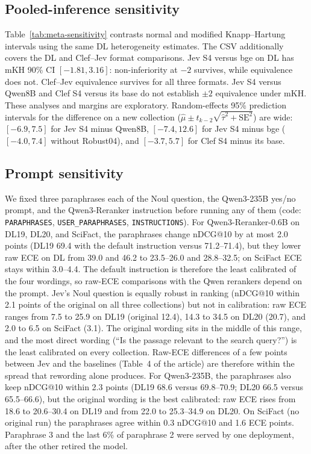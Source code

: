 \subsection{Pooled-inference sensitivity}

Table~\ref{tab:meta-sensitivity} contrasts normal and modified Knapp--Hartung intervals using the same DL heterogeneity estimates. The CSV additionally covers the DL and Clef--Jev format comparisons. Jev S4 versus bge on DL has mKH 90\% CI $[-1.81,3.16]$: non-inferiority at $-2$ survives, while equivalence does not. Clef--Jev equivalence survives for all three formats. Jev S4 versus Qwen8B and Clef S4 versus its base do not establish $\pm2$ equivalence under mKH. These analyses and margins are exploratory. Random-effects 95\% prediction intervals for the difference on a new collection ($\hat\mu\pm t_{k-2}\sqrt{\hat\tau^2+\mathrm{SE}^2}$) are wide: $[-6.9,7.5]$ for Jev S4 minus Qwen8B, $[-7.4,12.6]$ for Jev S4 minus bge ($[-4.0,7.4]$ without Robust04), and $[-3.7,5.7]$ for Clef S4 minus its base.

\subsection{Prompt sensitivity}\label{app:prompts}

We fixed three paraphrases each of the Noul question, the Qwen3-235B yes/no prompt, and the Qwen3-Reranker instruction before running any of them (code: \texttt{PARAPHRASES}, \texttt{USER\_PARAPHRASES}, \texttt{INSTRUCTIONS}). For Qwen3-Reranker-0.6B on DL19, DL20, and SciFact, the paraphrases change nDCG@10 by at most 2.0 points (DL19 69.4 with the default instruction versus 71.2--71.4), but they lower raw ECE on DL from 39.0 and 46.2 to 23.5--26.0 and 28.8--32.5; on SciFact ECE stays within 3.0--4.4. The default instruction is therefore the least calibrated of the four wordings, so raw-ECE comparisons with the Qwen rerankers depend on the prompt. Jev's Noul question is equally robust in ranking (nDCG@10 within 2.1 points of the original on all three collections) but not in calibration: raw ECE ranges from 7.5 to 25.9 on DL19 (original 12.4), 14.3 to 34.5 on DL20 (20.7), and 2.0 to 6.5 on SciFact (3.1). The original wording sits in the middle of this range, and the most direct wording (``Is the passage relevant to the search query?'') is the least calibrated on every collection. Raw-ECE differences of a few points between Jev and the baselines (Table~4 of the article) are therefore within the spread that rewording alone produces. For Qwen3-235B, the paraphrases also keep nDCG@10 within 2.3 points (DL19 68.6 versus 69.8--70.9; DL20 66.5 versus 65.5--66.6), but the original wording is the best calibrated: raw ECE rises from 18.6 to 20.6--30.4 on DL19 and from 22.0 to 25.3--34.9 on DL20. On SciFact (no original run) the paraphrases agree within 0.3 nDCG@10 and 1.6 ECE points. Paraphrase 3 and the last 6\% of paraphrase 2 were served by one deployment, after the other retired the model.

